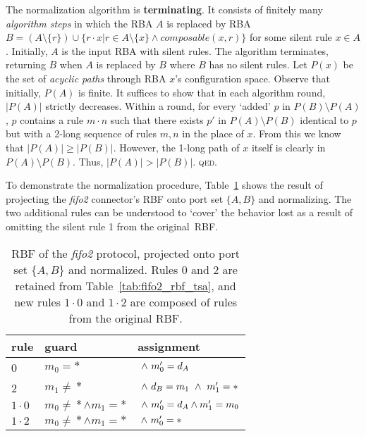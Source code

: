 The normalization algorithm is \textbf{terminating}. It consists of finitely many \textit{algorithm steps} in which the RBA $A$ is replaced by RBA $B=(A \setminus{}\{r\}) \cup{} \{r\cdot{}x | r\in{} A\setminus{}\{x\} \wedge{} composable(x,r)\}$ for some silent rule $x \in{} A$. Initially, $A$ is the input RBA with silent rules. The algorithm terminates, returning $B$ when $A$ is replaced by $B$ where $B$ has no silent rules. Let $P(x)$ be the set of \textit{acyclic paths} through RBA $x$'s configuration space. Observe that initially, $P(A)$ is finite. It suffices to show that in each algorithm round, $|P(A)|$ strictly decreases. Within a round, for every `added' $p$ in $P(B)\setminus{}P(A)$, $p$ contains a rule $m\cdot{}n$ such that there exists $p'$ in $P(A)\setminus{}P(B)$ identical to $p$ but with a 2-long sequence of rules $m, n$ in the place of $x$. From this we know that $|P(A)| \geq |P(B)|$. However, the 1-long path of $x$ itself is clearly in $P(A)\setminus{} P(B)$. Thus, $|P(A)| > |P(B)|$. \textsc{qed}.

To demonstrate the normalization procedure, Table~\ref{tab:fifo2_rbf_tsa_norm} shows the result of projecting the \textit{fifo2} connector's RBF onto port set $\{A,B\}$ and normalizing. The two additional rules can be understood to `cover' the behavior lost as a result of omitting the silent rule 1 from the original~RBF.


\begin{table}
	\centering
	\begin{tabular}{l|ll|}
		rule & guard & assignment \\
		\hline
		0 & $m_0=*$ & $\ \wedge{}\ {}m_0'=d_A$\\
		2 & $m_1\neq{}*$ & $\ \wedge{}\ {}d_B=m_1\ \wedge{}\ {}m_1'=*$ \\
		\hline
		$1\cdot{}0$ & $m_0\neq{}*\wedge{}m_1=*$ & $\ \wedge{}\ {}m_0'=d_A\wedge{}m_1'=m_0$ \\
		$1\cdot{}2$ & $m_0\neq{}*\wedge{}m_1=*$ & $\ \wedge{}\ {}m_0'=*$ \\
		\hline
	\end{tabular}
	\caption[RBF of fifo2 connector, projected and normalized.]{RBF of the \textit{fifo2} protocol, projected onto port set $\{A,B\}$ and normalized. Rules 0 and 2 are retained from Table~\ref{tab:fifo2_rbf_tsa}, and new rules $1\cdot{}0$ and $1\cdot{}2$ are composed of rules from the original RBF.}
	\label{tab:fifo2_rbf_tsa_norm}
\end{table}



